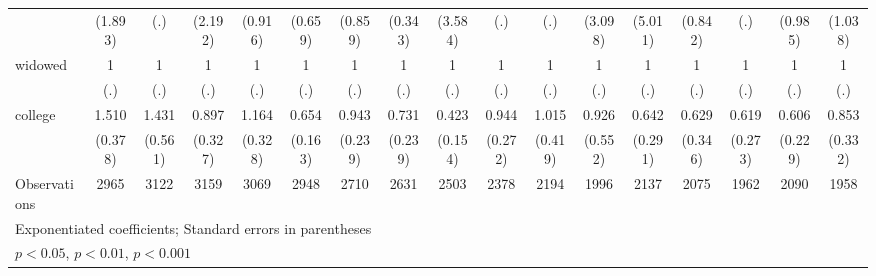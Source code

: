{\begin{tabular}{l*{16}{c}}
                    &     (1.893)         &         (.)         &     (2.192)         &     (0.916)         &     (0.659)         &     (0.859)         &     (0.343)         &     (3.584)         &         (.)         &         (.)         &     (3.098)         &     (5.011)         &     (0.842)         &         (.)         &     (0.985)         &     (1.038)         \\
[1em]
widowed             &           1         &           1         &           1         &           1         &           1         &           1         &           1         &           1         &           1         &           1         &           1         &           1         &           1         &           1         &           1         &           1         \\
                    &         (.)         &         (.)         &         (.)         &         (.)         &         (.)         &         (.)         &         (.)         &         (.)         &         (.)         &         (.)         &         (.)         &         (.)         &         (.)         &         (.)         &         (.)         &         (.)         \\
[1em]
college             &       1.510         &       1.431         &       0.897         &       1.164         &       0.654         &       0.943         &       0.731         &       0.423\sym{*}  &       0.944         &       1.015         &       0.926         &       0.642         &       0.629         &       0.619         &       0.606         &       0.853         \\
                    &     (0.378)         &     (0.561)         &     (0.327)         &     (0.328)         &     (0.163)         &     (0.239)         &     (0.239)         &     (0.154)         &     (0.272)         &     (0.419)         &     (0.552)         &     (0.291)         &     (0.346)         &     (0.273)         &     (0.229)         &     (0.332)         \\
\hline
Observations        &        2965         &        3122         &        3159         &        3069         &        2948         &        2710         &        2631         &        2503         &        2378         &        2194         &        1996         &        2137         &        2075         &        1962         &        2090         &        1958         \\
\hline\hline
\multicolumn{17}{l}{\footnotesize Exponentiated coefficients; Standard errors in parentheses}\\
\multicolumn{17}{l}{\footnotesize \sym{*} \(p<0.05\), \sym{**} \(p<0.01\), \sym{***} \(p<0.001\)}\\
\end{tabular}
}
